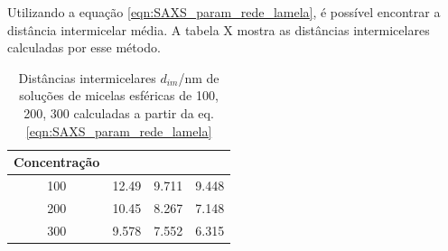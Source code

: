 	Utilizando a equação \ref{eqn:SAXS_param_rede_lamela}, é possível encontrar a distância intermicelar média. A tabela X mostra as distâncias intermicelares calculadas por esse método.
	
	
		\begin{table}[h]
		\IBGEtab%
		{\caption{Distâncias intermicelares \(d_{im}\)/nm de soluções de micelas esféricas de \CTDTAB{} 100, 200, 300 \mM{} calculadas a partir da eq. \ref{eqn:SAXS_param_rede_lamela}}
			\label{tab:SAXS_dim}}%
		{\begin{tabular}{c c c c}
			\toprule
			Concentração & \CTAB  & \TTAB & \DTAB  \\ \midrule
			    100      & 12.49 & 9.711 & 9.448 \\
			    200      & 10.45 & 8.267 & 7.148 \\
			    300      & 9.578 & 7.552 & 6.315 \\ \bottomrule
		\end{tabular}}%
		{}
	\end{table}  %
	
